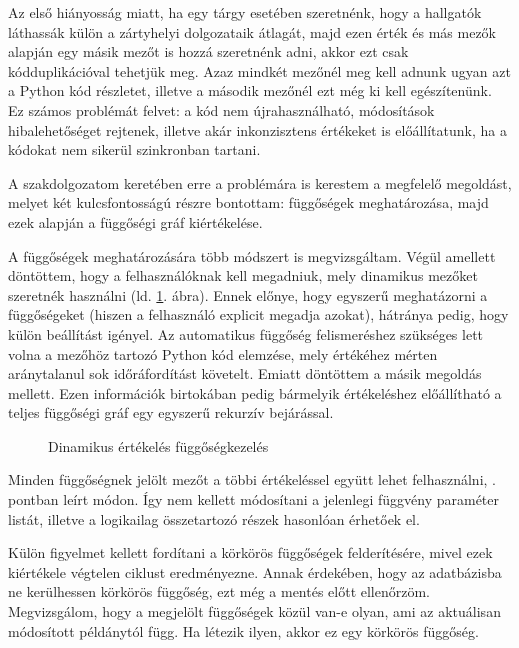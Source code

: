 Az első hiányosság miatt, ha egy tárgy esetében szeretnénk, hogy a hallgatók láthassák külön a zártyhelyi dolgozataik átlagát, majd ezen érték és más mezők alapján egy másik mezőt is hozzá szeretnénk adni, akkor ezt csak kódduplikációval tehetjük meg. Azaz mindkét mezőnél meg kell adnunk ugyan azt a Python kód részletet, illetve a második mezőnél ezt még ki kell egészítenünk. Ez számos problémát felvet: a kód nem újrahasználható, módosítások hibalehetőséget rejtenek, illetve akár inkonzisztens értékeket is előállítatunk, ha a kódokat nem sikerül szinkronban tartani.

A szakdolgozatom keretében erre a problémára is kerestem a megfelelő megoldást, melyet két kulcsfontosságú részre bontottam: függőségek meghatározása, majd ezek alapján a függőségi gráf kiértékelése.

A függőségek meghatározására több módszert is megvizsgáltam. Végül amellett döntöttem, hogy a felhasználóknak kell megadniuk, mely dinamikus mezőket szeretnék használni (ld. \ref{fig:jporta_dynamic_dependencies}. ábra). Ennek előnye, hogy egyszerű meghatázorni a függőségeket (hiszen a felhasználó explicit megadja azokat), hátránya pedig, hogy külön beállítást igényel. Az automatikus függőség felismeréshez szükséges lett volna a mezőhöz tartozó Python kód elemzése, mely értékéhez mérten aránytalanul sok időráfordítást követelt. Emiatt döntöttem a másik megoldás mellett. Ezen információk birtokában pedig bármelyik értékeléshez előállítható a teljes függőségi gráf egy egyszerű rekurzív bejárással.

\begin{figure}[h]
    \centering
    \caption{Dinamikus értékelés függőségkezelés}
    \label{fig:jporta_dynamic_dependencies}
\end{figure}

Minden függőségnek jelölt mezőt a többi értékeléssel együtt lehet felhasználni, . pontban leírt módon. Így nem kellett módosítani a jelenlegi függvény paraméter listát, illetve a logikailag összetartozó részek hasonlóan érhetőek el.

Külön figyelmet kellett fordítani a körkörös függőségek felderítésére, mivel ezek kiértékele végtelen ciklust eredményezne. Annak érdekében, hogy az adatbázisba ne kerülhessen körkörös függőség, ezt még a mentés előtt ellenőrzöm. Megvizsgálom, hogy a megjelölt függőségek közül van-e olyan, ami az aktuálisan módosított példánytól függ. Ha létezik ilyen, akkor ez egy körkörös függőség.

